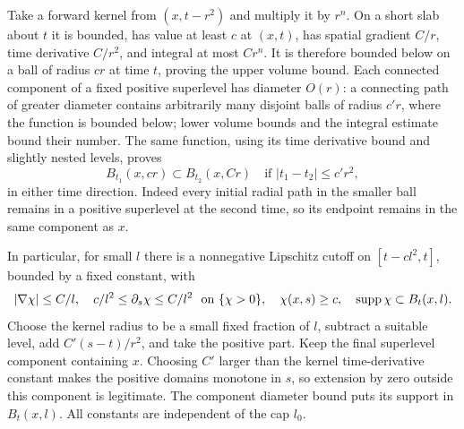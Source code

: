 Take a forward kernel from $(x,t-r^2)$ and multiply it by $r^n$.
On a short slab about $t$ it is bounded, has value at least $c$ at
$(x,t)$, has spatial gradient $C/r$, time derivative $C/r^2$, and
integral at most $Cr^n$. It is therefore bounded below on a ball of
radius $cr$ at time $t$, proving the upper volume bound. Each
connected component of a fixed positive superlevel has diameter
$O(r)$: a connecting path of greater diameter contains arbitrarily
many disjoint balls of radius $c'r$, where the function is bounded
below; lower volume bounds and the integral estimate bound their
number. The same function, using its time derivative bound and
slightly nested levels, proves
\begin{equation}\label{geom:rough-ball-transfer}
 B_{t_1}(x,cr)\subset B_{t_2}(x,Cr)
       \quad\text{if }|t_1-t_2|\leq c'r^2,
\end{equation}
in either time direction. Indeed every initial radial path in the
smaller ball remains in a positive superlevel at the second time, so
its endpoint remains in the same component as $x$.

In particular, for small $l$ there is a nonnegative Lipschitz cutoff
on $[t-cl^2,t]$, bounded by a fixed constant, with
\begin{equation}\label{geom:heat-cutoff}
 |\nabla\chi|\leq C/l,\quad
 c/l^2\leq\partial_s\chi\leq C/l^2\ \text{ on }\{\chi>0\},
 \quad\chi(x,s)\geq c,\quad\operatorname{supp}\chi\subset B_t(x,l).
\end{equation}
Choose the kernel radius to be a small fixed fraction of $l$, subtract
a suitable level, add $C'(s-t)/r^2$, and take the positive part. Keep
the final superlevel component containing $x$. Choosing $C'$ larger
than the kernel time-derivative constant makes the positive domains
monotone in $s$, so extension by zero outside this component is
legitimate. The component diameter bound puts its support in
$B_t(x,l)$. All constants are independent of the cap $l_0$.

